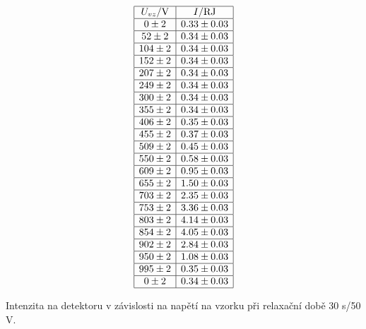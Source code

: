\documentclass[a4paper,12pt]{article}
\begin{document}
\begin{table}
$$
\begin{array}{|c|c|}
\hline
U_{vz}/\mbox{V}&    I/\mbox{RJ} \\ \hline
0\pm 2&0.33\pm 0.03 \\ \hline
52\pm 2&0.34\pm 0.03 \\ \hline
104\pm 2&0.34\pm 0.03 \\ \hline
152\pm 2&0.34\pm 0.03 \\ \hline
207\pm 2&0.34\pm 0.03 \\ \hline
249\pm 2&0.34\pm 0.03 \\ \hline
300\pm 2&0.34\pm 0.03 \\ \hline
355\pm 2&0.34\pm 0.03 \\ \hline
406\pm 2&0.35\pm 0.03 \\ \hline
455\pm 2&0.37\pm 0.03 \\ \hline
509\pm 2&0.45\pm 0.03 \\ \hline
550\pm 2&0.58\pm 0.03 \\ \hline
609\pm 2&0.95\pm 0.03 \\ \hline
655\pm 2&1.50\pm 0.03 \\ \hline
703\pm 2&2.35\pm 0.03 \\ \hline
753\pm 2&3.36\pm 0.03 \\ \hline
803\pm 2&4.14\pm 0.03 \\ \hline
854\pm 2&4.05\pm 0.03 \\ \hline
902\pm 2&2.84\pm 0.03 \\ \hline
950\pm 2&1.08\pm 0.03 \\ \hline
995\pm 2&0.35\pm 0.03 \\ \hline
0\pm 2&0.34\pm 0.03 \\ \hline
\end{array}
$$
\caption{Intenzita na detektoru v závislosti na napětí na vzorku při relaxační době 30 s/50 V.}
\label{TM30}
\end{table}
\end{document}
